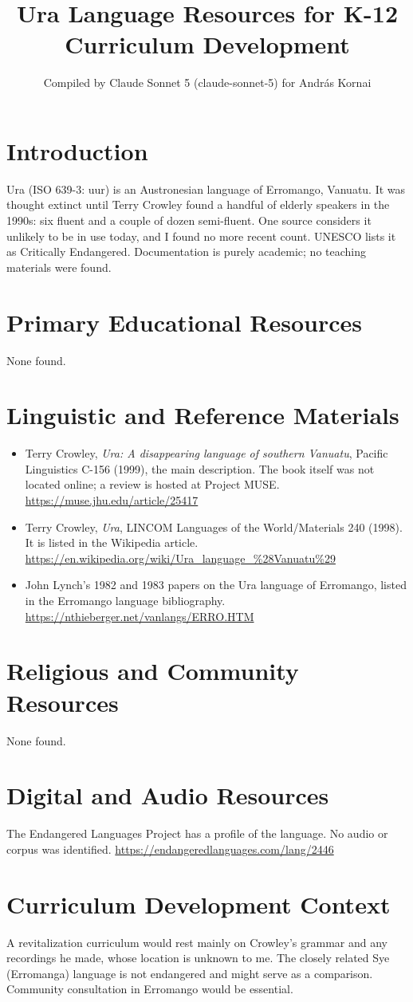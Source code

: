 \documentclass[12pt]{article}
\title{Ura Language Resources for K-12 Curriculum Development}
\author{Compiled by Claude Sonnet 5 (claude-sonnet-5) for Andr\'as Kornai}
\date{}
\begin{document}
\maketitle

\section{Introduction}
Ura (ISO 639-3: uur) is an Austronesian language of Erromango, Vanuatu. It was thought extinct until Terry Crowley found a handful of elderly speakers in the 1990s: six fluent and a couple of dozen semi-fluent. One source considers it unlikely to be in use today, and I found no more recent count. UNESCO lists it as Critically Endangered. Documentation is purely academic; no teaching materials were found.

\section{Primary Educational Resources}
None found.

\section{Linguistic and Reference Materials}
\begin{itemize}
\item Terry Crowley, \emph{Ura: A disappearing language of southern Vanuatu}, Pacific Linguistics C-156 (1999), the main description. The book itself was not located online; a review is hosted at Project MUSE. \url{https://muse.jhu.edu/article/25417}
\item Terry Crowley, \emph{Ura}, LINCOM Languages of the World/Materials 240 (1998). It is listed in the Wikipedia article. \url{https://en.wikipedia.org/wiki/Ura_language_%28Vanuatu%29}
\item John Lynch's 1982 and 1983 papers on the Ura language of Erromango, listed in the Erromango language bibliography. \url{https://nthieberger.net/vanlangs/ERRO.HTM}
\end{itemize}

\section{Religious and Community Resources}
None found.

\section{Digital and Audio Resources}
The Endangered Languages Project has a profile of the language. No audio or corpus was identified. \url{https://endangeredlanguages.com/lang/2446}

\section{Curriculum Development Context}
A revitalization curriculum would rest mainly on Crowley's grammar and any recordings he made, whose location is unknown to me. The closely related Sye (Erromanga) language is not endangered and might serve as a comparison. Community consultation in Erromango would be essential.
\end{document}

